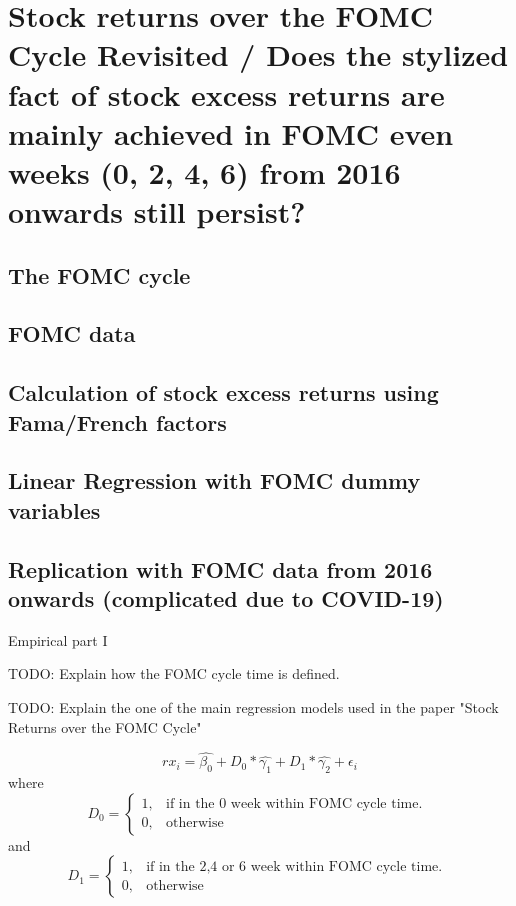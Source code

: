 \chapter{Stock returns over the FOMC Cycle Revisited / Does the stylized fact of stock excess returns are mainly achieved in FOMC even weeks (0,  2,  4,  6) from 2016 onwards still persist?}


\section{The FOMC cycle}

\section{FOMC data}

\section{Calculation of stock excess returns using Fama/French factors}

\section{Linear Regression with FOMC dummy variables}

\section{Replication with FOMC data from 2016 onwards (complicated due to COVID-19)}



Empirical part I

TODO: Explain how the FOMC cycle time is defined.

TODO: Explain the one of the main regression models used in the paper "Stock Returns over the FOMC Cycle" \parencite{cieslak_stock_2019}

\begin{equation}
	rx_{i}=\hat{\beta_{0}}+D_0*\hat{\gamma_{1}}+D_1*\hat{\gamma_{2}}+\epsilon_i
\end{equation}
where
\begin{equation}
    D_0=
    \begin{cases}
      1, & \text{if in the 0 week within FOMC cycle time. }\\
      0, & \text{otherwise}
    \end{cases}
\end{equation}
and
\begin{equation}
    D_1=
    \begin{cases}
      1, & \text{if in the 2,4 or 6 week within FOMC cycle time. } \\
      0, & \text{otherwise}
    \end{cases}
\end{equation}


